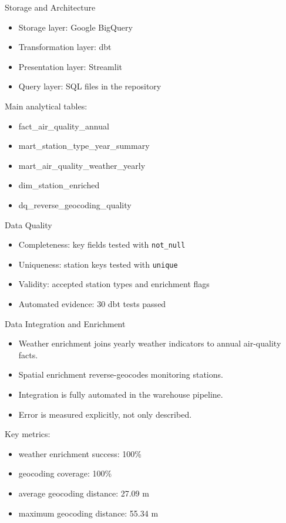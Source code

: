 \documentclass[aspectratio=169]{beamer}
\begin{document}
\begin{frame}{Storage and Architecture}
\begin{itemize}
  \item Storage layer: Google BigQuery
  \item Transformation layer: dbt
  \item Presentation layer: Streamlit
  \item Query layer: SQL files in the repository
\end{itemize}

\vspace{0.3cm}
Main analytical tables:
\begin{itemize}
  \item fact\_air\_quality\_annual
  \item mart\_station\_type\_year\_summary
  \item mart\_air\_quality\_weather\_yearly
  \item dim\_station\_enriched
  \item dq\_reverse\_geocoding\_quality
\end{itemize}
\end{frame}

\begin{frame}{Data Quality}
\begin{itemize}
  \item Completeness: key fields tested with \texttt{not\_null}
  \item Uniqueness: station keys tested with \texttt{unique}
  \item Validity: accepted station types and enrichment flags
  \item Automated evidence: 30 dbt tests passed
\end{itemize}
\end{frame}

\begin{frame}{Data Integration and Enrichment}
\begin{itemize}
  \item Weather enrichment joins yearly weather indicators to annual air-quality facts.
  \item Spatial enrichment reverse-geocodes monitoring stations.
  \item Integration is fully automated in the warehouse pipeline.
  \item Error is measured explicitly, not only described.
\end{itemize}

\vspace{0.3cm}
Key metrics:
\begin{itemize}
  \item weather enrichment success: 100\%
  \item geocoding coverage: 100\%
  \item average geocoding distance: 27.09 m
  \item maximum geocoding distance: 55.34 m
\end{itemize}
\end{frame}
\end{document}
